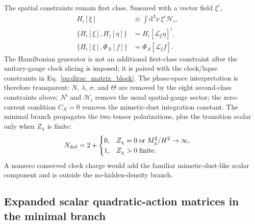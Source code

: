 \documentclass[aps,prd,reprint,nofootinbib,superscriptaddress,longbibliography]{revtex4-2}
\newcommand{\dd}{\mathrm{d}}
\begin{document}
The spatial constraints remain first class. Smeared with a vector field $\xi^i$,
\begin{align}
  H_i[\xi]&\equiv\int\dd^3x\,\xi^i\mathcal H_i,\\
  \{H_i[\xi],H_j[\eta]\}&=H_i[\mathcal L_\xi\eta]^i,\\
  \{H_i[\xi],\Phi_A[f]\}&=\Phi_A[\mathcal L_\xi f] .
\end{align}
The Hamiltonian generator is not an additional first-class constraint after the unitary-gauge clock slicing is imposed; it is paired with the clock/lapse constraints in Eq.~\eqref{eq:dirac_matrix_block}. The phase-space interpretation is therefore transparent: $N$, $\lambda$, $\sigma$, and $\Theta$ are removed by the eight second-class constraints above; $N^i$ and $\mathcal H_i$ remove the usual spatial-gauge sector; the zero-current condition $C_X=0$ removes the mimetic-dust integration constant. The minimal branch propagates the two tensor polarizations, plus the transition scalar only when $Z_\chi$ is finite:
\begin{equation}
  N_{\rm dof}=2+\begin{cases}
  0, & Z_\chi=0\;\hbox{or}\;M_\chi^2/H^2\rightarrow\infty,\\
  1, & Z_\chi>0\;\hbox{finite}.
  \end{cases}
  \label{eq:dof_count_explicit_addendum}
\end{equation}
A nonzero conserved clock charge would add the familiar mimetic-dust-like scalar component and is outside the no-hidden-density branch.

\subsection{Expanded scalar quadratic-action matrices in the minimal branch}
\label{app:expanded_scalar_matrices}
\end{document}

